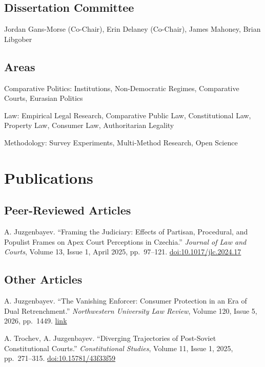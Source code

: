 \documentclass[11pt,letterpaper]{report}
\newcommand{\listitemspace}{0.25em}
\renewenvironment{itemize}
{\begin{list}{}{\setlength{\leftmargin}{0em}
                \setlength{\parskip}{0em}
                \setlength{\itemsep}{\listitemspace}
                \setlength{\parsep}{\listitemspace}}}
{\end{list}}
\begin{document}
    \subsection*{Dissertation Committee}
    Jordan Gans-Morse (Co-Chair), Erin Delaney (Co-Chair), James Mahoney, Brian Libgober

    \subsection*{Areas}
    \begin{itemize}
        \item Comparative Politics: Institutions, Non-Democratic Regimes, Comparative Courts, Eurasian Politics
        \item Law: Empirical Legal Research, Comparative Public Law, Constitutional Law, Property Law, Consumer Law, Authoritarian Legality
        \item Methodology: Survey Experiments, Multi-Method Research, Open Science
    \end{itemize}

    \section*{Publications}

   \subsection*{Peer-Reviewed Articles}

   \begin{tablist}

        \item[2025] \tab{}A. Juzgenbayev. \enquote{Framing the Judiciary: Effects of Partisan, Procedural, and Populist Frames on Apex Court Perceptions in Czechia.} \textit{Journal of Law and Courts}, Volume 13, Issue 1, April 2025, pp.~97--121. \href{https://doi.org/10.1017/jlc.2024.17}{doi:10.1017/jlc.2024.17}

    \end{tablist}

   \subsection*{Other Articles}

   \begin{tablist}

        \item[2026] \tab{}A. Juzgenbayev. \enquote{The Vanishing Enforcer: Consumer Protection in an Era of Dual Retrenchment.} \textit{Northwestern University Law Review}, Volume 120, Issue 5, 2026, pp.~1449. \href{https://scholarlycommons.law.northwestern.edu/nulr/vol120/iss5/6}{link}
        \item[2025] \tab{}A. Trochev, A. Juzgenbayev. \enquote{Diverging Trajectories of Post-Soviet Constitutional Courts.} \textit{Constitutional Studies}, Volume 11, Issue 1, 2025, pp.~271--315. \href{https://doi.org/10.15781/43f33f59}{doi:10.15781/43f33f59}

    \end{tablist}
\end{document}
